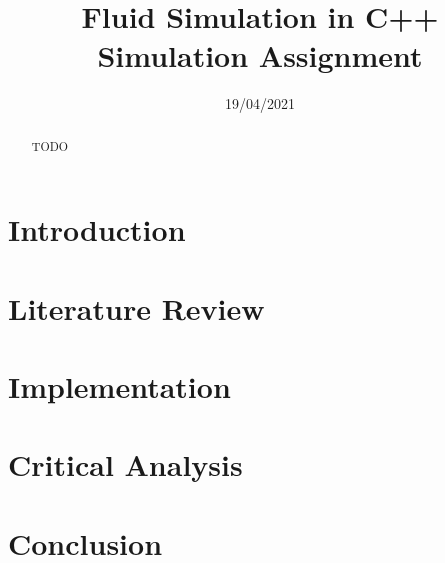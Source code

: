 \documentclass[notitlepage,12pt]{article}
\title{%
Fluid Simulation in C++ \\
\large Simulation Assignment}
\author{}
\date{19/04/2021}
\begin{document}
\maketitle

\thispagestyle{empty}

\begin{abstract}
\noindent TODO
\end{abstract}

\newpage
\clearpage
\setcounter{page}{1}

\section{Introduction}

\section{Literature Review}

\section{Implementation}

\section{Critical Analysis}

\section{Conclusion}

\clearpage


\end{document}
